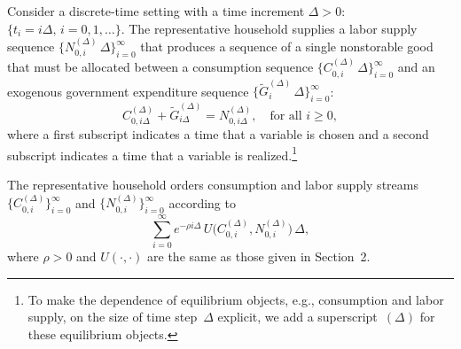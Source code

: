 \documentclass[12pt]{article}
\begin{document}
{{{Consider a discrete-time setting with a time increment $\Delta > 0$: $\{t_i = i\Delta,\, i = 0, 1, \ldots\}$. The representative household supplies a labor supply sequence $\{N_{0,i}^{(\Delta)}\, \Delta\}_{i=0}^\infty$ that produces a sequence of a single nonstorable good that must be allocated between a consumption sequence $\{C_{0,i}^{(\Delta)}\, \Delta\}_{i=0}^\infty$ and an exogenous government expenditure sequence $\{\tilde{G}_i^{(\Delta)}\, \Delta\}_{i=0}^\infty$:
\begin{equation}\label{eq:resource_dt}
C_{0,i\Delta}^{(\Delta)} + \tilde{G}_{i\Delta}^{(\Delta)} = N_{0,i\Delta}^{(\Delta)}, \quad \text{for all } i \ge 0,
\end{equation}
where a first subscript indicates a time that a variable is chosen and a second subscript indicates a time that a variable is realized.\footnote{To make the dependence of equilibrium objects, e.g., consumption and labor supply, on the size of time step~$\Delta$ explicit, we add a superscript~$(\Delta)$ for these equilibrium objects.}

The representative household orders consumption and labor supply streams $\{C_{0,i}^{(\Delta)}\}_{i=0}^\infty$ and $\{N_{0,i}^{(\Delta)}\}_{i=0}^\infty$ according to
\begin{equation}\label{eq:utility_dt}
\sum_{i=0}^\infty e^{-\rho i\Delta}\, U\bigl(C_{0,i}^{(\Delta)}, N_{0,i}^{(\Delta)}\bigr)\, \Delta,
\end{equation}
where $\rho > 0$ and $U(\cdot,\cdot)$ are the same as those given in Section~2.

}}}
\end{document}
